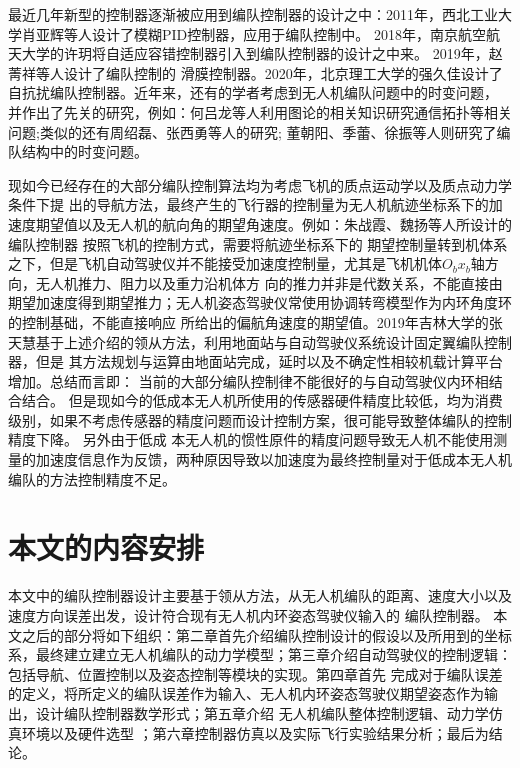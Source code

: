 最近几年新型的控制器逐渐被应用到编队控制器的设计之中：2011年，西北工业大学肖亚辉等人设计了模糊PID控制器，应用于编队控制中。\cite{XiaoYaHui2011}
2018年，南京航空航天大学的许玥将自适应容错控制器引入到编队控制器的设计之中来。\cite{XuYue} 2019年，赵菁祥等人设计了编队控制的
滑膜控制器。2020年，北京理工大学的强久佳设计了自抗扰编队控制器。\cite{MengXiuyun2020}近年来，还有的学者考虑到无人机编队问题中的时变问题，
并作出了先关的研究，例如：何吕龙等人利用图论的相关知识研究通信拓扑等相关问题\cite{Helvlong2020};类似的还有周绍磊\cite{Zhoushaolei2020}、张西勇\cite{Zhangxiyong2019}等人的研究;
董朝阳\cite{Dongzhaoyang2020}、季蕾\cite{Jilei2019}、徐振\cite{Xuzhen2019}等人则研究了编队结构中的时变问题。

现如今已经存在的大部分编队控制算法均为考虑飞机的质点运动学以及质点动力学条件下提
出的导航方法，最终产生的飞行器的控制量为无人机航迹坐标系下的加速度期望值以及无人机的航向角的期望角速度。例如：朱战霞、魏扬等人所设计的编队控制器
按照飞机的控制方式，需要将航迹坐标系下的
期望控制量转到机体系之下，但是飞机自动驾驶仪并不能接受加速度控制量，尤其是飞机机体$O_bx_b$轴方向，无人机推力、阻力以及重力沿机体方
向的推力并非是代数关系，不能直接由期望加速度得到期望推力；无人机姿态驾驶仪常使用协调转弯模型作为内环角度环的控制基础，不能直接响应
所给出的偏航角速度的期望值。2019年吉林大学的张天慧基于上述介绍的领从方法，利用地面站与自动驾驶仪系统设计固定翼编队控制器，\cite{Zhangtianhui2019}但是
其方法规划与运算由地面站完成，延时以及不确定性相较机载计算平台增加。总结而言即：
当前的大部分编队控制律不能很好的与自动驾驶仪内环相结合结合。
但是现如今的低成本无人机所使用的传感器硬件精度比较低，均为消费级别，如果不考虑传感器的精度问题而设计控制方案，很可能导致整体编队的控制精度下降。
另外由于低成
本无人机的惯性原件的精度问题导致无人机不能使用测量的加速度信息作为反馈，两种原因导致以加速度为最终控制量对于低成本无人机编队的方法控制精度不足。
\section{本文的内容安排}
本文中的编队控制器设计主要基于领从方法，从无人机编队的距离、速度大小以及速度方向误差出发，设计符合现有无人机内环姿态驾驶仪输入的
编队控制器。
本文之后的部分将如下组织：第二章首先介绍编队控制设计的假设以及所用到的坐标系，最终建立建立无人机编队的动力学模型；第三章介绍自动驾驶仪的控制逻辑：包括导航、位置控制以及姿态控制等模块的实现。第四章首先
完成对于编队误差的定义，将所定义的编队误差作为输入、无人机内环姿态驾驶仪期望姿态作为输出，设计编队控制器数学形式；第五章介绍
无人机编队整体控制逻辑、动力学仿真环境以及硬件选型 ；第六章控制器仿真以及实际飞行实验结果分析；最后为结论。
